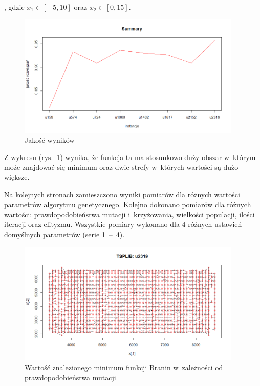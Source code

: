 \documentclass[11pt, a4paper]{article}
\newcommand{\fbi}{\leavevmode{\parindent=1em\indent}}
\begin{document}
, gdzie $ x_1 \in [-5, 10] $ oraz $ x_2 \in [0, 15] $.

\begin{figure}[H]
	\centering
	\includegraphics[width=0.95\textwidth]{./assets/tsp_results.png}
	\caption{Jakość wyników}
	\label{fig:branin1}
\end{figure}

\fbi
Z wykresu (rys.~\ref{fig:branin1}) wynika, że funkcja ta ma stosunkowo duży obszar w~którym może znajdować się minimum oraz dwie strefy w~których wartości są dużo większe.

\fbi
Na kolejnych stronach zamieszczono wyniki pomiarów dla różnych wartości parametrów algorytmu genetycznego. Kolejno dokonano pomiarów dla różnych wartości: prawdopodobieństwa mutacji i~krzyżowania, wielkości populacji, ilości iteracji oraz elityzmu. Wszystkie pomiary wykonano dla 4 różnych ustawień domyślnych parametrów (serie 1~--~4).

\newpage
\begin{figure}[H]
	\centering
	\includegraphics[width=0.95\textwidth]{./assets/overview_u2319.png}
	\caption{Wartość znalezionego minimum funkcji Branin w~zależności od prawdopodobieństwa mutacji}
	\label{fig:branin2}
\end{figure}
\end{document}

